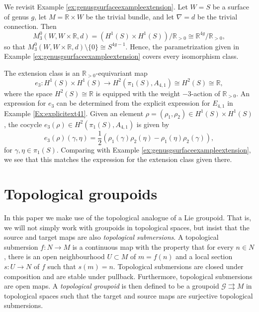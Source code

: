 \documentclass[10pt]{amsart}
\numberwithin{theoremalpha}{section}
\numberwithin{equation}{section}
\numberwithin{definition}{section}
\numberwithin{theorem}{section}
\numberwithin{proposition}{section}
\numberwithin{lemma}{section}
\numberwithin{example}{section}
\numberwithin{remark}{section}
\numberwithin{corollary}{section}
\numberwithin{question}{section}
\numberwithin{problem}{section}
\numberwithin{assumption}{section}
\theoremstyle{named}
\numberwithin{equation}{section}
\begin{document}
\begin{example}
We revisit Example \ref{ex:genusgsurfaceexampleextension}. Let $W = S$ be a surface of genus $g$, let $M = \mathbb{R} \times W$ be the trivial bundle, and let $\nabla = d$ be the trivial connection. Then 
\[
M_{3}^{0}(W, W \times \mathbb{R}, d) = (H^{1}(S) \times H^{1}(S))/\mathbb{R}_{>0} \cong \mathbb{R}^{4g}/\mathbb{R}_{>0},
\]
so that $M_{3}^{0}(W, W \times \mathbb{R}, d) \setminus \{ 0 \} \cong S^{4g - 1}$. Hence, the parametrization given in Example \ref{ex:genusgsurfaceexampleextension} covers every isomorphism class. 

The extension class is an $\mathbb{R}_{>0}$-equivariant map 
\[
e_{3} : H^{1}(S) \times H^{1}(S) \to H^2(\pi_1(S), A_{4,1}) \cong H^2(S) \cong \mathbb{R},
\]
where the space $H^2(S) \cong \mathbb{R}$ is equipped with the weight $-3$-action of $\mathbb{R}_{>0}$. An expression for $e_{3}$ can be determined from the explicit expression for $E_{4,1}$ in Example \ref{Ex:explicitext41}. Given an element $\rho = (\rho_1, \rho_2) \in H^{1}(S) \times H^{1}(S)$, the cocycle $e_{3}(\rho) \in H^2(\pi_1(S), A_{4,1})$ is given by 
\[
e_{3}(\rho)(\gamma, \eta) = \frac{1}{2}(\rho_1(\gamma) \rho_2(\eta) - \rho_{1}(\eta) \rho_2(\gamma)),
\]
for $\gamma, \eta \in \pi_{1}(S)$. Comparing with Example \ref{ex:genusgsurfaceexampleextension}, we see that this matches the expression for the extension class given there. 
\end{example}


\newpage



\appendix
\newpage
\section{Topological groupoids}\label{sec:topgroupoids}

In this paper we make use of the topological analogue of a Lie groupoid. That is, we will not simply work with groupoids in topological spaces, but insist that the source and target maps are also \emph{topological submersions}. A topological submersion $f: N \to M$ is a continuous map with the property that for every $n \in N$, there is an open neighbourhood $U \subset M$ of $m = f(n)$ and a local section $s: U \to N$ of $f$ such that $s(m) = n$. Topological submersions are closed under composition and are stable under pullback. Furthermore, topological submersions are open maps. A \emph{topological groupoid} is then defined to be a groupoid $\mathcal{G} \rightrightarrows M$ in topological spaces such that the target and source maps are surjective topological submersions. 
\end{document}
